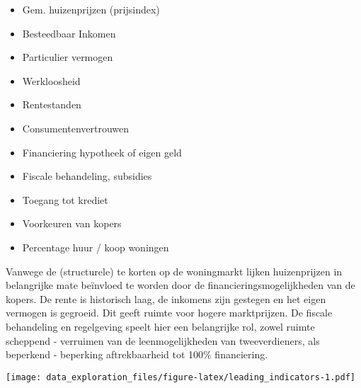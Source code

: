 \documentclass[
]{article}
\newenvironment{Shaded}{\begin{snugshade}}{\end{snugshade}}
\newcommand{\CommentTok}[1]{\textcolor[rgb]{0.56,0.35,0.01}{\textit{#1}}}
\newcommand{\DataTypeTok}[1]{\textcolor[rgb]{0.13,0.29,0.53}{#1}}
\newcommand{\KeywordTok}[1]{\textcolor[rgb]{0.13,0.29,0.53}{\textbf{#1}}}
\newcommand{\NormalTok}[1]{#1}
\newcommand{\OperatorTok}[1]{\textcolor[rgb]{0.81,0.36,0.00}{\textbf{#1}}}
\newcommand{\StringTok}[1]{\textcolor[rgb]{0.31,0.60,0.02}{#1}}
\providecommand{\tightlist}{%
  \setlength{\itemsep}{0pt}\setlength{\parskip}{0pt}}
\begin{document}
\begin{itemize}
\tightlist
\item
  Gem. huizenprijzen (prijsindex)
\item
  Besteedbaar Inkomen
\item
  Particulier vermogen
\item
  Werkloosheid
\item
  Rentestanden
\item
  Consumentenvertrouwen
\item
  Financiering hypotheek of eigen geld
\item
  Fiscale behandeling, subsidies
\item
  Toegang tot krediet
\item
  Voorkeuren van kopers
\item
  Percentage huur / koop woningen
\end{itemize}

Vanwege de (structurele) te korten op de woningmarkt lijken
huizenprijzen in belangrijke mate beïnvloed te worden door de
financieringsmogelijkheden van de kopers. De rente is historisch laag,
de inkomens zijn gestegen en het eigen vermogen is gegroeid. Dit geeft
ruimte voor hogere marktprijzen. De fiscale behandeling en regelgeving
speelt hier een belangrijke rol, zowel ruimte scheppend - verruimen van
de leenmogelijkheden van tweeverdieners, als beperkend - beperking
aftrekbaarheid tot 100\% financiering.

\begin{Shaded}
\end{Shaded}

\texttt{[image: data\_exploration\_files/figure-latex/leading\_indicators-1.pdf]}
\end{document}
